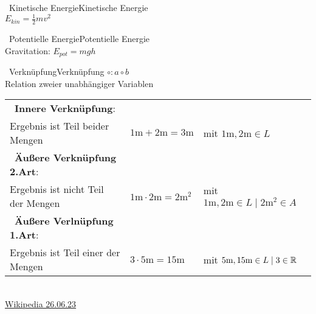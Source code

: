  \label{cap:undef}
	 \label{sec:undef_mathe}
		\begin{proposition}{\currentboxsection \ Kinetische Energie}{Kinetische Energie} \label{Ekin} \\
			$ E_{kin} = \frac{1}{2}mv^2 $
		\end{proposition}
	
		\begin{proposition}{\currentboxsection \ Potentielle Energie}{Potentielle Energie} \label{Epot} \\
			Gravitation: $ E_{pot} = mgh $
		\end{proposition}
		
		\begin{proposition}{\currentboxsection \ Verknüpfung}{Verknüpfung} \label{verknuepfung}  \hspace{10cm} $\circ : a \circ b$ \\
			Relation zweier unabhängiger Variablen \\
			\begin{tabular}{@{}lll@{}}
				\textbullet \ \textbf{Innere Verknüpfung}: \label{innere_verkuepfung} & & \\
				Ergebnis ist Teil beider Mengen & $1\text{m} + 2\text{m} = 3\text{m}$ &mit $1\text{m}, 2\text{m} \in L$ \\
				\textbullet \ \textbf{Äußere Verknüpfung 2.Art}: \label{aeussere_verknuepfung_2} & & \\
				Ergebnis ist nicht Teil der Mengen & $1\text{m} \cdot 2\text{m} = 2\text{m}^2$ &mit $1\text{m}, 2\text{m} \in L \mid 2\text{m}^2 \in A$ \\
				\textbullet \ \textbf{Äußere Verlnüpfung 1.Art}: \label{aeussere_verknuepfung_1} & & \\
				Ergebnis ist Teil einer der Mengen & $3 \cdot 5\text{m} = 15\text{m}$ &mit $5\text{m}, 15\text{m} \in L \mid 3 \in \mathbb{R}$ \\
			\end{tabular} \\	
			\href{https://de.wikipedia.org/wiki/Verkn%C3%BCpfung_(Mathematik)}{Wikipedia 26.06.23}
		\end{proposition}
		
